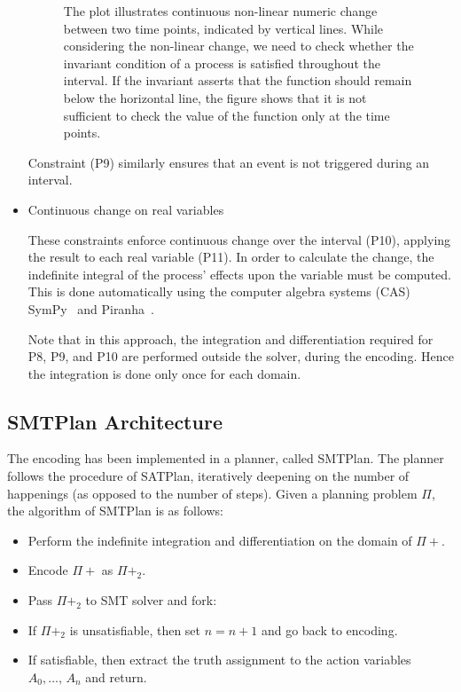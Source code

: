 \begin{itemize}
\begin{figure*}[htb!]
\center

\caption{The plot illustrates continuous non-linear numeric change between two time points, indicated by vertical lines. While considering the non-linear change, we need to check whether the invariant condition of a process is satisfied throughout the interval. If the invariant asserts that the function should remain below the horizontal line, the figure shows that it is not sufficient to check the value of the function only at the time points.}
\label{fig:Zero_cross}
\end{figure*}

Constraint (P9) similarly ensures that an event is not triggered during an interval.

\item Continuous change on real variables

These constraints enforce continuous change over the interval (P10), applying the result to each real variable (P11). In order to calculate the change, the indefinite integral of the process' effects upon the variable must be computed. This is done automatically using the computer algebra systems (CAS) SymPy~\cite{sympy} and Piranha~\cite{bis18}.

Note that in this approach, the integration and differentiation required for P8, P9, and P10 are performed outside the solver, during the encoding. Hence the integration is done only once for each domain.
\end{itemize}

\subsection{SMTPlan Architecture} \label{sssec:SMTPlan_Archi}

The encoding has been implemented in a planner, called {\sc SMTPlan}. The planner follows the procedure of {\sc SATPlan}, iteratively deepening on the number of happenings (as opposed to the number of steps). Given a planning problem $\Pi$, the algorithm of {\sc SMTPlan} is as follows:

\begin{itemize}
\item
Perform the indefinite integration and differentiation on the domain of $\Pi+$.
\item
Encode $\Pi+$ as $\Pi+_2$.
\item
Pass $\Pi+_2$ to SMT solver and fork:
\item
If $\Pi+_2$ is unsatisfiable, then set $n=n+1$ and go back to encoding.
\item
If satisfiable, then extract the truth assignment to the action variables $A_0, \ldots,\, A_n$ and return.
\end{itemize}

